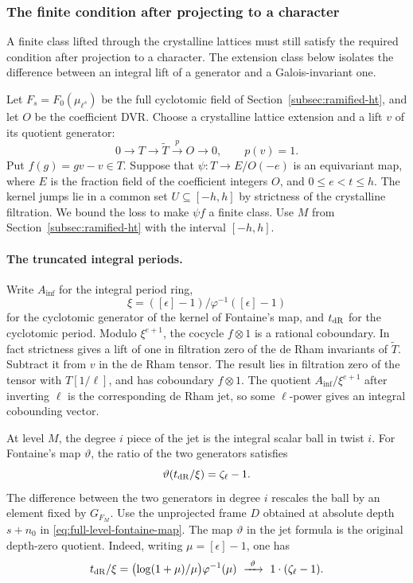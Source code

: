 \subsubsection*{The finite condition after projecting to a character}
\label{subsec:ramified-character}

A finite class lifted through the crystalline lattices must still satisfy the required condition after projection to a character. The extension class below isolates the difference between an integral lift of a generator and a Galois-invariant one.

Let \(F_s=F_0(\mu_{\ell^s})\) be the full cyclotomic field of
Section~\ref{subsec:ramified-ht}, and let \(O\) be the coefficient DVR.
Choose a crystalline lattice extension and a lift \(v\) of its quotient generator:
\[
 0\longrightarrow T\longrightarrow\widetilde T\xrightarrow{p}O\longrightarrow0,\qquad p(v)=1.
\]
Put \(f(g)=gv-v\in T\).
Suppose that \(\psi:T\to E/O(-e)\) is an equivariant
map, where \(E\) is the fraction field of the
coefficient integers \(O\), and \(0\le e<t\le h\).
The kernel jumps lie in a common set
\(U\subseteq[-h,h]\) by strictness of the crystalline
filtration. We bound the loss to make
\(\psi f\) a finite class. Use \(M\) from
Section~\ref{subsec:ramified-ht} with the interval
\([-h,h]\).

\paragraph{The truncated integral periods.}
Write \(A_{\inf}\) for the integral period ring,
\[
 \xi=([\epsilon]-1)/\varphi^{-1}([\epsilon]-1)
\]
for the cyclotomic generator of the kernel of
Fontaine's map, and \(t_{\rm dR}\) for the
cyclotomic period.
Modulo \(\xi^{e+1}\), the cocycle
\(f\otimes1\) is a rational coboundary.
In fact strictness gives a lift of one in filtration
zero of the de Rham invariants of \(\widetilde T\).
Subtract it from \(v\) in the de Rham tensor.
The result lies in filtration zero of the tensor
with \(T[1/\ell]\), and has coboundary \(f\otimes1\).
The quotient \(A_{\inf}/\xi^{e+1}\) after inverting
\(\ell\) is the corresponding de Rham jet, so some
\(\ell\)-power gives an integral cobounding vector.

At level \(M\), the degree \(i\) piece of the jet
is the integral scalar ball in twist \(i\).
For Fontaine's map \(\vartheta\), the ratio of the two generators satisfies
\[
 \vartheta(t_{\rm dR}/\xi)=\zeta_\ell-1.
\]
The difference between the two
generators in degree \(i\) rescales the ball by an
element fixed by \(G_{F_M}\). Use the unprojected
frame \(D\) obtained at absolute depth \(s+n_0\) in
\eqref{eq:full-level-fontaine-map}. The map \(\vartheta\) in the jet
formula is the original depth-zero quotient. Indeed, writing
\(\mu=[\epsilon]-1\), one has
\[
  t_{\rm dR}/\xi
   =\bigl(\log(1+\mu)/\mu\bigr)\varphi^{-1}(\mu)
   \ \xrightarrow{\ \vartheta\ }\ 1\cdot(\zeta_\ell-1).
\]


